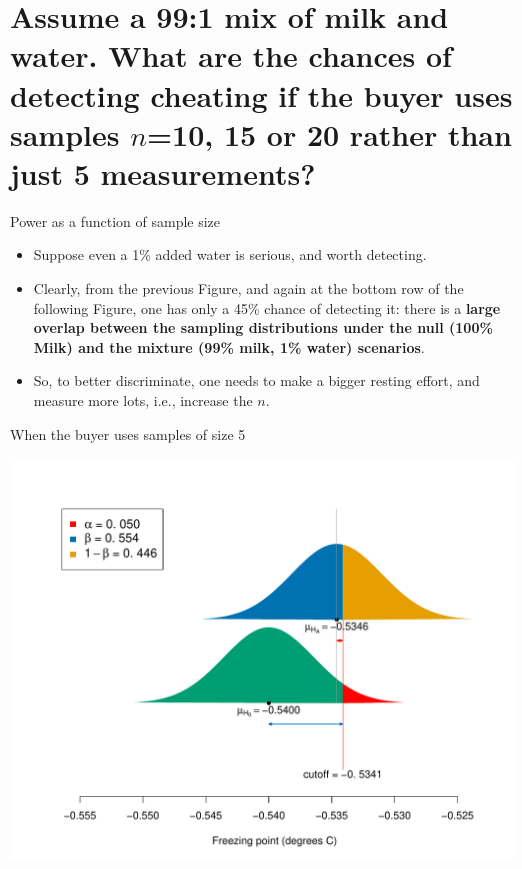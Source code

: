 \documentclass[handout]{beamer}\usepackage[]{graphicx}\usepackage[]{color}
\newenvironment{knitrout}{}{} %
\begin{document}
\section{Assume a 99:1 mix of milk and water. What are the chances of detecting cheating if the buyer uses samples $n$=10, 15 or 20 rather than just 5 measurements?}

\begin{frame}{Power as a function of sample size}

\begin{itemize}
	\setlength\itemsep{1em}
	\item Suppose even a 1\% added water is serious, and worth detecting.
\item Clearly, from the previous Figure, and again at the bottom row of the following Figure,
one has only a 45\% chance of detecting it: there is a \textbf{large overlap between the sampling distributions under the null (100\% Milk) and the mixture (99\% milk, 1\% water) scenarios}. \pause 

\item So, to better discriminate, one needs to make a bigger resting effort, and measure more lots,
i.e., increase the $n$.
\end{itemize}
\end{frame}


\begin{frame}[fragile]{When the buyer uses samples of size 5}
\begin{knitrout}\scriptsize
{}\color{fgcolor}

{\centering \includegraphics[width=1\linewidth]{figure/unnamed-chunk-10-1} 

}



\end{knitrout}
\end{frame}
\end{document}
